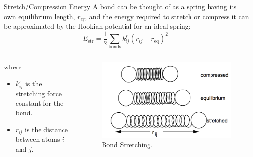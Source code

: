 \documentclass[aspectratio=169]{beamer}
\begin{document}
\begin{frame}[fragile]{Stretch/Compression Energy}
A bond can be thought of as a spring having its own equilibrium length, $r_{eq}$, and the energy required to stretch or compress it can be approximated by the Hookian potential for an ideal spring:
%
\begin{equation}
	E_{\text{str}} = \frac{1}{2} \sum_{\text{bonds}} k_{ij}^s \left(r_{ij} - r_{\text{eq}}\right)^2,
\end{equation}
%
%
\begin{columns}
\begin{column}{0.5\textwidth}
	where
	\begin{itemize}
		\item $k_{ij}^s$ is the stretching force constant for the bond.
		\item $r_{ij}$ is the distance between atoms $i$ and $j$.
	\end{itemize}
\end{column}
%
\begin{column}{0.5\textwidth} 
	\begin{figure}
		\includegraphics[scale=0.5]{Graphics/stretch.png}
		\caption{Bond Stretching.}
	\end{figure}
\end{column}
\end{columns}
%

\end{frame}
\end{document}
